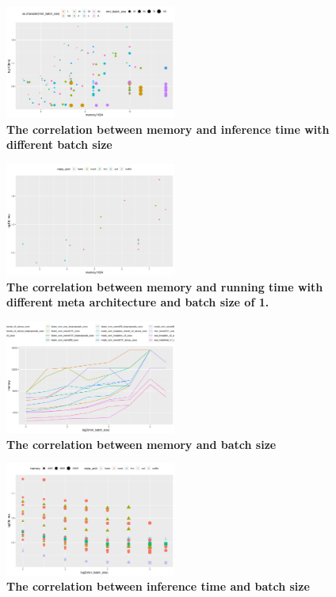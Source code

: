 \documentclass[conference]{IEEEtran}
\begin{document}
\begin{figure}[htpb]
	  \centering
	  \includegraphics[width=0.5\textwidth]{MemoryVSRunning-Batch}
	  \caption{\textbf{The correlation between memory and inference time with different batch size}}
	  \label{fig:memory-running-batch}
\end{figure}


\begin{figure}[htpb]
	  \centering
	  \includegraphics[width=0.5\textwidth]{MemoryVSRunning-Meta}
	  \caption{\textbf{The correlation between memory and running time with different meta architecture and batch size of 1.}}
	  \label{fig:memory-running-meta}
\end{figure}

\begin{figure}[htpb]
	  \centering
	  \includegraphics[width=0.5\textwidth]{MemoryVSBatch}
	  \caption{\textbf{The correlation between memory and batch size}}
	  \label{fig:memory-batch}
\end{figure}

\begin{figure}[htpb]
	  \centering
	  \includegraphics[width=0.5\textwidth]{RunningTimeVSBatch}
	  \caption{\textbf{The correlation between inference time and batch size}}
	  \label{fig:running-batch}
\end{figure}
\end{document}
